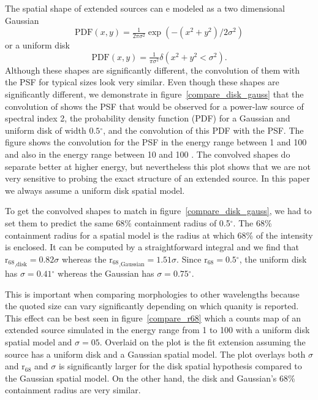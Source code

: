 \documentclass[12pt,preprint]{aastex}
\newcommand{\gev}{\text{GeV}\xspace}
\newcommand{\rsixeight}{{\ensuremath{\text{r}_{68}}}\xspace}
\renewcommand{\deg}{\ensuremath{^\circ}\xspace}
\begin{document}
The spatial shape of extended sources can e modeled
as a two dimensional Gaussian
\begin{equation}
  \text{PDF}(x,y)=\tfrac{1}{2\pi\sigma^2}\exp\left(-(x^2+y^2)/2\sigma^2\right)
\end{equation}
or a uniform disk
\begin{equation}
  \text{PDF}(x,y)=\tfrac{1}{\pi\sigma^2}\delta\left(x^2+y^2<\sigma^2\right).
\end{equation}
Although these shapes are significantly different, the convolution
of them with the PSF for typical sizes look very similar.  Even
though these shapes are significantly different, we demonstrate in
figure~\ref{compare_disk_gauss} that the convolution of shows the
PSF that would be observed for a power-law source of spectral index
2, the probability density function (PDF) for a Gaussian and uniform
disk of width $0.5\deg$, and the convolution of this PDF with the PSF.
The figure shows the convolution for the PSF in the energy range between
1 \gev and 100 \gev and also in the energy range between 10 \gev and
100 \gev.  The convolved shapes do separate better at higher energy, but
nevertheless this plot shows that we are not very sensitive to probing
the exact structure of an extended source.  In this paper we always
assume a uniform disk spatial model.

To get the convolved shapes to match in figure~\ref{compare_disk_gauss},
we had to set them to predict the same 68\% containment radius of 0.5\deg.  The
68\% containment radius for a spatial model is the radius at which 68\%
of the intensity is enclosed.  It can be computed by a straightforward
integral and we find that $\rsixeight_\text{,disk}=0.82\sigma$ whereas the
$\rsixeight_\text{,Gaussian}=1.51\sigma$.  Since $\rsixeight=0.5\deg$,
the uniform disk has $\sigma=0.41\deg$ whereas the Gaussian has
$\sigma=0.75\deg$.

This is important when comparing morphologies to other wavelengths
because the quoted size can vary significantly depending on which quanity
is reported.  This effect can be best seen in figure~\ref{compare_r68}
which a counts map of an extended source simulated in the energy
range from 1 \gev to 100 \gev with a uniform disk spatial model and
$\sigma=05$. Overlaid on the plot is the fit extension assuming the
source has a uniform disk and a Gaussian spatial model. The plot overlays
both $\sigma$ and $\rsixeight$ and $\sigma$ is significantly larger for
the disk spatial hypothesis compared to the Gaussian spatial model. On
the other hand, the disk and Gaussian's 68\% containment radius are
very similar.
\end{document}
